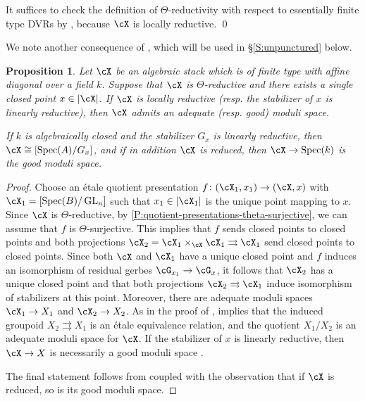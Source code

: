 \documentclass[a4paper]{amsart}
\numberwithin{equation}{section}
\theoremstyle{plain}
\newtheorem{prop}[thm]{Proposition}
\theoremstyle{definition}
\newcommand{\epf}{\qed \vspace{+10pt}}
\DeclareMathOperator{\Spec}{Spec}
\DeclareMathOperator{\GL}{GL}
\newcommand{\co}{\colon}
\begin{document}
It suffices to check the definition of $\Theta$-reductivity with respect to essentially finite type DVRs by , because $\cX$ is locally reductive.
\epf




We note another consequence of , which will be used in \S \ref{S:unpunctured} below.

\begin{prop} \label{P:GMS_one_point}
Let $\cX$ be an algebraic stack which is of finite type with affine diagonal over a field $k$.  Suppose that $\cX$ is $\Theta$-reductive and there exists a single closed point $x \in |\cX|$.  If $\cX$ is locally reductive (resp. the stabilizer of $x$ is linearly reductive), then $\cX$ admits an adequate (resp. good) moduli space.

If $k$ is algebraically closed and the stabilizer $G_x$ is linearly reductive, then $\cX \cong [\Spec(A)/G_x]$, and if in addition $\cX$ is reduced, then $\cX \to \Spec(k)$ is the good moduli space.
\end{prop}


\begin{proof}
Choose an \'etale quotient presentation $f \co (\cX_1,x_1) \to (\cX,x)$ with $\cX_1=[\Spec(B)/\GL_n]$ such that $x_1 \in |\cX_1|$ is the unique point mapping to $x$. Since $\cX$ is $\Theta$-reductive, by \eqref{P:quotient-presentations-theta-surjective}, we can assume that $f$ is $\Theta$-surjective.  This implies that $f$ sends closed points to closed points and both projections $\cX_2 = \cX_1 \times_{\cX} \cX_1 \rightrightarrows \cX_1$ send closed points to closed points. Since both $\cX$ and $\cX_1$ have a unique closed point and $f$ induces an isomorphism of residual gerbes $\cG_{x_1} \to \cG_x$, it follows that $\cX_2$ has a unique closed point and that both projections $\cX_2 \rightrightarrows \cX_1$ induce isomorphism of stabilizers at this point.  Moreover, there are adequate moduli spaces $\cX_1 \to X_1$ and $\cX_2 \to X_2$.  As in the proof of ,  implies that the induced groupoid $X_2 \rightrightarrows X_1$ is an \'etale equivalence relation, and the quotient $X_1/X_2$ is an adequate moduli space for $\cX$. If the stabilizer of $x$ is linearly reductive, then $\cX \to X$ is necessarily a good moduli space \cite[Thm.~9.3]{ahr2}.

The final statement follows from  \cite[Thms.~2.9 and ~3.14]{ahr2} coupled with the observation that if $\cX$ is reduced, so is its good moduli space.
\end{proof}
\end{document}
